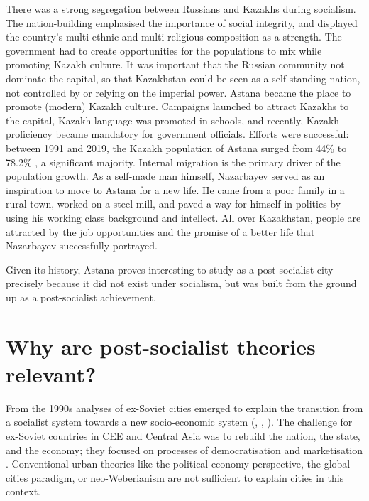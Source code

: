 \documentclass{article}
\begin{document}
There was a strong segregation between Russians and Kazakhs during socialism. The nation-building emphasised the importance of social integrity, and displayed the country's multi-ethnic and multi-religious composition as a strength. The government had to create opportunities for the populations to mix while promoting Kazakh culture. It was important that the Russian community not dominate the capital, so that Kazakhstan could be seen as a self-standing nation, not controlled by or relying on the imperial power. 
Astana became the place to promote (modern) Kazakh culture. 
Campaigns launched to attract Kazakhs to the capital, Kazakh language was promoted in schools, and recently, Kazakh proficiency became mandatory for government officials. Efforts were successful: between 1991 and 2019, the Kazakh population of Astana surged from 44\% to 78.2\% \parencite{unfpa2020wekazakhstan}, a significant majority. 
Internal migration is the primary driver of the population growth. As a self-made man himself, Nazarbayev served as an inspiration to move to Astana for a new life. He came from a poor family in a rural town, worked on a steel mill, and paved a way for himself in politics by using his working class background and intellect. All over Kazakhstan, people are attracted by the job opportunities and the promise of a better life that Nazarbayev successfully portrayed.

Given its history, Astana proves interesting to study as a post-socialist city precisely because it did not exist under socialism, but was built from the ground up as a post-socialist achievement.

\section{Why are post-socialist theories relevant?}

From the 1990s analyses of ex-Soviet cities emerged to explain the transition from a socialist system towards a new socio-economic system (\cite{smith1996socialist}, \cite{sailer1999characteristics}, \cite{hirt2013whatever}). The challenge for ex-Soviet countries in CEE and Central Asia was to rebuild the nation, the state, and the economy; they focused on processes of democratisation and marketisation \parencite{ferenvcuhova2016introduction}. 
Conventional urban theories like the political economy perspective, the global cities paradigm, or neo-Weberianism \parencite{haussermann2005european} are not sufficient to explain cities in this context.
\end{document}
